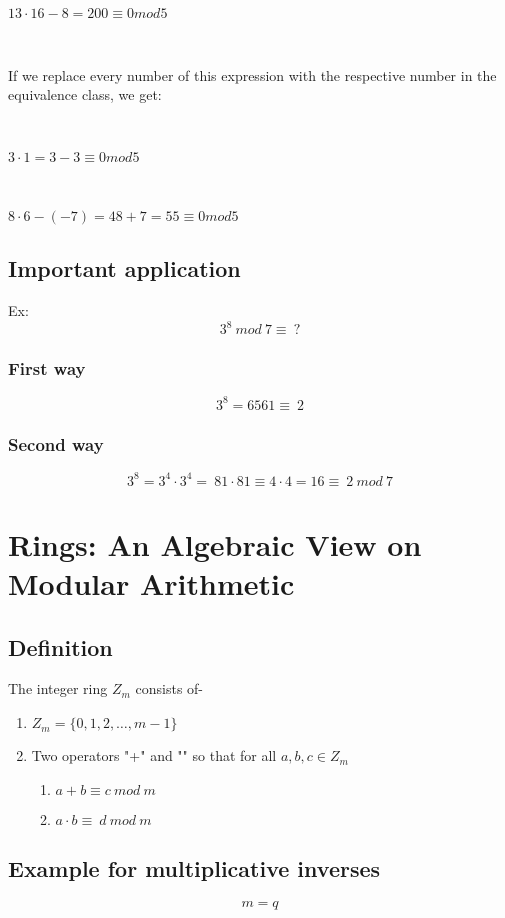 \documentclass[a4paper]{article}
\begin{document}
$13\cdot16-8=200\equiv0mod5$

\

If we replace every number of this expression with the respective number in the equivalence class, we get:

\


$ 3\cdot1=3-3\equiv0mod5$

\

$8\cdot6-(-7)=48+7=55\equiv0mod5$

\subsection{Important application}

Ex: $$3^8 \ mod \ 7 \equiv \ ?$$

\subsubsection{First way}
$$3^8 = 6561 \equiv \ 2 $$

\subsubsection{Second way}
$$3^8 = 3^4 \cdot 3^4 = \ 81 \cdot 81 \equiv 4\cdot4=16\equiv \ 2 \ mod \ 7 $$

\section{Rings: An Algebraic View on Modular Arithmetic}

\subsection{Definition}
The integer ring $Z_m$ consists of-

\begin{enumerate}
\item
   $Z_m = \{ 0, 1, 2, \ldots, m-1\}$
\item
    Two operators "+" and "\cdot" so that for all $a,b,c \in Z_m$
    \begin{enumerate}
        \item $a+b \equiv c \ mod \ m$
        \item $a\cdot b \equiv \ d \ mod \ m$
    \end{enumerate}

\end{enumerate}
\subsection{Example for multiplicative inverses}
$$m = q$$
\end{document}
